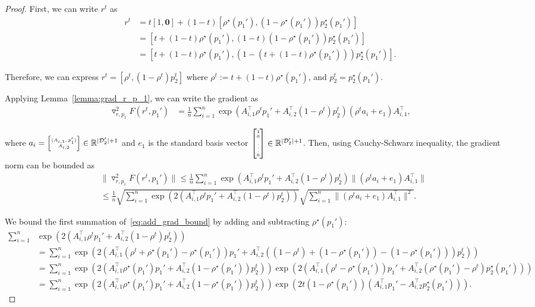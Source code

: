 \begin{proof}

First, we can write $r^t$ as
\begin{align*}
    r^t &= t[1, \mathbf{0}] + (1 - t) [\rho^\star(p_1'), (1 - \rho^\star(p_1')) p_2^\star(p_1')] \\
    &= [t + (1 - t) \rho^\star(p_1'), (1 - t) (1 - \rho^\star(p_1')) p_2^\star(p_1')] \\
    &= [t + (1 - t) \rho^\star(p_1'), (1 - (t + (1 - t) \rho^\star(p_1'))) p_2^\star(p_1')].
\end{align*}

Therefore, we can express $r^t = [\rho^t, (1 - \rho^t) p_2^t]$ where $\rho^t := t + (1 - t) \rho^\star(p_1')$, and $p_2^t = p_2^\star(p_1')$. 

Applying Lemma~\ref{lemma:grad_r_p_1}, we can write the gradient as
\begin{align*}
    \triangledown^2_{r,p_1} F(r^t,p_1') &= \frac{1}{n}\sum_{i = 1}^n \exp(A_{i, 1}^\top \rho^t p_1' + A_{i, 2}^\top (1 - \rho^t) p_2^t) (\rho^t a_i + e_1) A_{i, 1}^\top,
\end{align*}

where $a_i = \SmallMatrix{\langle A_{i, 1}, p_1' \rangle \\ A_{i, 2}}  \in \R^{|\D_2'| + 1}$ and $e_1$ is the standard basis vector $\SmallMatrix{1 \\ 0 \\ \vdots \\ 0} \in \R^{|\D_2'| + 1}$. Then, using Cauchy-Schwarz inequality, the gradient norm can be bounded as
\begin{align}
&\|\triangledown^2_{r,p_1}F(r^t,p_1')\| \le \frac{1}{n}\sum_{i = 1}^n \exp(A_{i, 1}^\top \rho^t p_1' + A_{i, 2}^\top (1 - \rho^t) p_2^t) \|(\rho^t a_i + e_1) A_{i, 1}^\top\| \label{eq:add_grad_bound} \\
&\le \frac{1}{n}\sqrt{\sum_{i = 1}^n \exp(2(A_{i, 1}^\top \rho^t p_1' + A_{i, 2}^\top (1 - \rho^t) p_2^t))} \sqrt{\sum_{i = 1}^n \|(\rho^t a_i + e_1) A_{i, 1}^\top\|^2}. \nonumber 
\end{align}

We bound the first summation of~\eqref{eq:add_grad_bound} by adding and subtracting $\rho^\star(p_1')$:
\begin{align*}
\sum_{i = 1}^n &\exp(2(A_{i, 1}^\top \rho^t p_1' + A_{i, 2}^\top (1 - \rho^t) p_2^t)) \\
&= \sum_{i = 1}^n \exp(2(A_{i, 1}^\top (\rho^t + \rho^\star(p_1') - \rho^\star(p_1')) p_1' + A_{i, 2}^\top ((1 - \rho^t) + (1 - \rho^\star(p_1')) - (1 - \rho^\star(p_1'))) p_2^t)) \\
&= \sum_{i = 1}^n \exp(2(A_{i, 1}^\top \rho^\star(p_1') p_1' + A_{i, 2}^\top (1 - \rho^\star(p_1')) p_2^t)) \exp(2(A_{i, 1}^\top (\rho^t - \rho^\star(p_1')) p_1' + A_{i,2}^\top (\rho^\star(p_1') - \rho^t) p_2^\star(p_1') )) \\
&= \sum_{i = 1}^n \exp(2(A_{i, 1}^\top \rho^\star(p_1') p_1' + A_{i, 2}^\top (1 - \rho^\star(p_1')) p_2^t)) \exp(2t (1 - \rho^\star(p_1'))(A_{i, 1}^\top p_1' - A_{i, 2}^\top p_2^\star(p_1'))).
\end{align*}


\end{proof}
